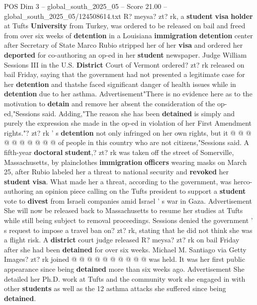 \begin{textsample}{POS Dim 3 – global\_south\_2025\_05 – Score 21.00 – global\_south\_2025\_05/124508614.txt}  \label{ex:f3_pos_281}
R? meysa? zt? rk, a \textbf{student} \textbf{visa} \textbf{holder} at Tufts \textbf{University} from Turkey, was ordered to be released on bail and freed from over six weeks of \textbf{detention} in a Louisiana \textbf{immigration} \textbf{detention} center after Secretary of State Marco Rubio stripped her of her \textbf{visa} and ordered her \textbf{deported} for co-authoring an op-ed in her \textbf{student} newspaper.
Judge William Sessions III in the U.S. \textbf{District} Court of Vermont ordered? zt? rk released on bail Friday, saying that the government had not presented a legitimate case for her \textbf{detention} and thatshe faced significant danger of health issues while in \textbf{detention} due to her asthma.
Advertisement"There is no evidence here as to the motivation to \textbf{detain} and remove her absent the consideration of the op-ed,"Sessions said.
Adding,"The reason she has been \textbf{detained} is simply and purely the expression she made in the op-ed in violation of her First Amendment rights."? zt? rk ' s \textbf{detention} not only infringed on her own rights, but it @ @ @ @ @ @ @ @ @ @ of people in this country who are not citizens,"Sessions said.
A fifth-year \textbf{doctoral} \textbf{student},? zt? rk was taken off the street of Somerville, Massachusetts, by plainclothes \textbf{immigration} \textbf{officers} wearing masks on March 25, after Rubio labeled her a threat to national security and \textbf{revoked} her \textbf{student} \textbf{visa}.
What made her a threat, according to the government, was herco-authoring an opinion piece calling on the Tufts president to support a \textbf{student} vote to \textbf{divest} from Israeli companies amid Israel ' s war in Gaza.
Advertisement She will now be released back to Massachusetts to resume her studies at Tufts while still being subject to removal proceedings.
Sessions denied the government ' s request to impose a travel ban on? zt? rk, stating that he did not think she was a flight risk.
A \textbf{district} court judge released R? meysa? zt? rk on bail Friday after she had been \textbf{detained} for over six weeks.
Michael M.
Santiago via Getty Images? zt? rk joined @ @ @ @ @ @ @ @ @ @ was held.
It was her first public appearance since being \textbf{detained} more than six weeks ago.
Advertisement She detailed her Ph.D. work at Tufts and the community work she engaged in with other \textbf{students} as well as the 12 asthma attacks she suffered since being \textbf{detained}.

\end{textsample}
